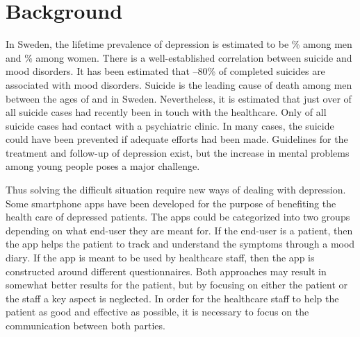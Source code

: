 \documentclass[12pt,a4paper,oneside]{article}
\let\oldcite\cite
\renewcommand*\cite[1]{\textsuperscript{\oldcite{#1}}}
\begin{document}
\section*{Background}
In Sweden, the lifetime prevalence of depression is estimated to be {}\% among men and {}\% among women\cite{numbers0}. There is a well-established correlation between suicide and mood disorders\cite{numbers1.1}. It has been estimated that {--80}\% of completed suicides are associated with mood disorders\cite{numbers1.1}. Suicide is the leading cause of death among men between the ages of {} and {} in Sweden\cite{numbers3.0.1}. Nevertheless, it is estimated that just over  of all suicide cases had recently been in touch with the healthcare. Only  of all suicide cases had contact with a psychiatric clinic\cite{numbers2}. In many cases, the suicide could have been prevented if adequate efforts had been made\cite{numbers1}. Guidelines for the treatment and follow-up of depression exist, but the increase in mental problems among young people poses a major challenge\cite{guide1, regionjh1}.

Thus solving the difficult situation require new ways of dealing with depression. Some smartphone apps have been developed for the purpose of benefiting the health care of depressed patients. The apps could be categorized into two groups depending on what end-user they are meant for. If the end-user is a patient, then the app helps the patient to track and understand the symptoms through a mood diary\cite{app1}. If the app is meant to be used by healthcare staff, then the app is constructed around different questionnaires\cite{app2}. Both approaches may result in somewhat better results for the patient, but by focusing on either the patient or the staff a key aspect is neglected. In order for the healthcare staff to help the patient as good and effective as possible, it is necessary to focus on the communication between both parties.
\end{document}
